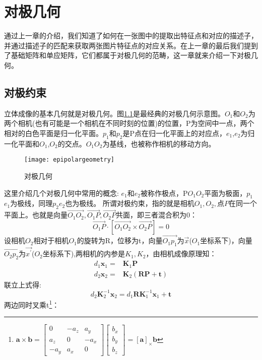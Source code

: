 \chapter{对极几何}
通过上一章的介绍，我们知道了如何在一张图中的提取出特征点和对应的描述子，并通过描述子的匹配来获取两张图片特征点的对应关系。在上一章的最后我们提到了基础矩阵和单应矩阵，它们都属于对极几何的范畴，这一章就来介绍一下对极几何。
\section{对极约束}
立体成像的基本几何就是对极几何。图\ref{epipolargeometry}是最经典的对极几何示意图。$O_1$和$O_2$为两个相机(也有可能是一个相机在不同时刻的位置)的位置，P为空间中一点，两个相对的白色平面是归一化平面。$p_1$和$p_2$是P点在归一化平面上的对应点，$e_1$,$e_2$为归一化平面和$O_1$,$O_2$的交点。$O_1$$O_2$为基线，也被称作相机的移动方向。\par
\begin{figure}[H]
	\centering
	\texttt{[image: epipolargeometry]}
	\caption{对极几何}
	\label{epipolargeometry}
\end{figure}
这里介绍几个对极几何中常用的概念: $e_1$和$e_2$被称作极点，P$O_1$$O_2$平面为极面，$p_1$$e_1$为极线，同理$p_2$$e_2$也为极线。
所谓对极约束，指的就是相机$O_1,O_2,\text{点}P$在同一个平面上。也就是向量$\overrightarrow{O_1O_2},\overrightarrow{O_1P},\overrightarrow{O_2P}$共面，即三者混合积为0：
\begin{equation}
\overrightarrow{O_1P}\cdot\left[\overrightarrow{O_1O_2}\times\overrightarrow{O_2P} \right]=0
\end{equation}
设相机$O_2$相对于相机$O_1$的旋转为R，位移为t，向量$\overrightarrow{O_1p_1}$为$\vec{x}$($O_1$坐标系下)，向量$\overrightarrow{O_2p_2}$为$\vec{x^\prime}$($O_2$坐标系下),两相机的内参是$K_1,K_2$，由相机成像原理知：
\begin{equation}
\begin{aligned}
	d_{1} \boldsymbol{x}_{1}=&\boldsymbol{K}_{1} \boldsymbol{P}\\
	d_{2} \boldsymbol{x}_{2}=&\boldsymbol{K}_{2}(\boldsymbol{R P}+\boldsymbol{t})
\end{aligned}
\end{equation}
联立上式得:
\begin{equation}
d_{2} \boldsymbol{K}_{2}^{-1} \boldsymbol{x}_{2}=d_{1}\boldsymbol{R} \boldsymbol{K}_{1}^{-1} \boldsymbol{x}_{1}+\boldsymbol{t}
\end{equation}
两边同时叉乘t\footnote{$\mathbf{a} \times \mathbf{b}=\left[ \begin{array}{ccc}{0} & {-a_{z}} & {a_{y}} \\ {a_{z}} & {0} & {-a_{x}} \\ {-a_{y}} & {a_{x}} & {0}\end{array}\right] \left[ \begin{array}{l}{b_{x}} \\ {b_{y}} \\ {b_{z}}\end{array}\right]=\left[ \mathbf{a}\right]_{\times}\mathbf{b}$}：
